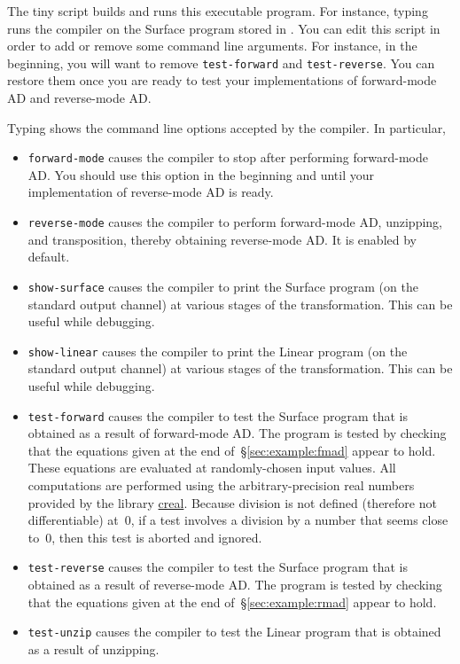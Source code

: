 \documentclass{article}
\begin{document}
The tiny script  builds and runs this executable program. For
instance, typing  runs the compiler on the
Surface program stored in . You can edit this
script in order to add or remove some command line arguments. For instance, in
the beginning, you will want to remove \texttt{\dash test-forward} and
\texttt{\dash test-reverse}. You can restore them once you are ready to test
your implementations of forward-mode AD and reverse-mode AD.

Typing  shows the command line options accepted by the
compiler. In particular,
\begin{itemize}
\item \texttt{\dash forward-mode} causes the compiler to stop after performing
      forward-mode AD. You should use this option in the beginning and until
      your implementation of reverse-mode AD is ready.
\item \texttt{\dash reverse-mode} causes the compiler to perform
      forward-mode AD, unzipping, and transposition,
      thereby obtaining reverse-mode AD. It is enabled by default.
\item \texttt{\dash show-surface} causes the compiler to print the Surface
      program (on the standard output channel) at various stages of the
      transformation. This can be useful while debugging.
\item \texttt{\dash show-linear} causes the compiler to print the Linear
      program (on the standard output channel) at various stages of the
      transformation. This can be useful while debugging.
\item \texttt{\dash test-forward} causes the compiler to test the Surface
      program that is obtained as a result of forward-mode AD. The program is
      tested by checking that the equations given at the end
      of~\S\ref{sec:example:fmad} appear to hold. These equations
      are evaluated at randomly-chosen input values.
      All computations are performed using the
      arbitrary-precision real numbers provided by the library
      \href{https://github.com/backtracking/creal}{creal}.
      Because division is not defined (therefore not differentiable) at~0,
      if a test involves a division by a number that seems close to~0,
      then this test is aborted and ignored.
\item \texttt{\dash test-reverse} causes the compiler to test the Surface
      program that is obtained as a result of reverse-mode AD. The program is
      tested by checking that the equations given at the end
      of~\S\ref{sec:example:rmad} appear to hold.
\item \texttt{\dash test-unzip} causes the compiler to test the Linear
      program that is obtained as a result of unzipping.
\end{itemize}
\end{document}
